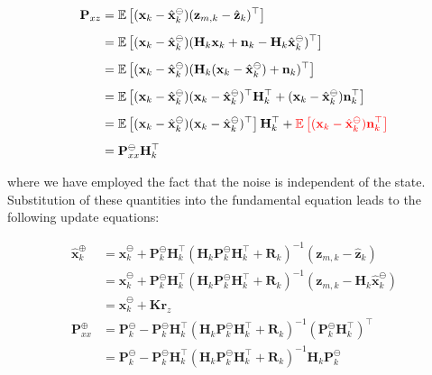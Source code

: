 \begin{align*} \mathbf{P}_{xz} &= \mathbb{E}\left[ (\mathbf{x}_k - {\hat{\mathbf{x}}_k^\ominus})(\mathbf{z}_{m,k} - \hat{\mathbf{z}}_k)^\top \right] \\[5px] &= \mathbb{E}\left[ (\mathbf{x}_k - {\hat{\mathbf{x}}_k^\ominus}) (\mathbf{H}_k\mathbf{x}_k + \mathbf{n}_k - \mathbf{H}_k{\hat{\mathbf{x}}_k^\ominus})^\top \right] \\[5px] &= \mathbb{E}\left[ (\mathbf{x}_k - {\hat{\mathbf{x}}_k^\ominus}) (\mathbf{H}_k(\mathbf{x}_k - {\hat{\mathbf{x}}_k^\ominus}) + \mathbf{n}_k)^\top \right] \\[5px] &= \mathbb{E}\left[ (\mathbf{x}_k - {\hat{\mathbf{x}}_k^\ominus})(\mathbf{x}_k - {\hat{\mathbf{x}}_k^\ominus})^\top\mathbf{H}_k^\top +(\mathbf{x}_k - {\hat{\mathbf{x}}_k^\ominus})\mathbf{n}_k^\top \right] \\[5px] &= \mathbb{E}\left[ (\mathbf{x}_k - {\hat{\mathbf{x}}_k^\ominus})(\mathbf{x}_k - {\hat{\mathbf{x}}_k^\ominus})^\top\right]\mathbf{H}_k^\top + \textcolor{red}{\mathbb{E}\left[(\mathbf{x}_k - {\hat{\mathbf{x}}_k^\ominus})\mathbf{n}_k^\top \right]} \\[5px] &= \mathbf{P}_{xx}^\ominus\mathbf{H}_k^\top \end{align*}

where we have employed the fact that the noise is independent of the state. Substitution of these quantities into the fundamental equation leads to the following update equations\+:

\begin{align*} \hat{\mathbf{x}}_k^\oplus &= {\hat{\mathbf{x}}_k^\ominus} + \mathbf{P}_{k}^\ominus\mathbf{H}_k^\top (\mathbf{H}_k\mathbf{P}_{k}^\ominus\mathbf{H}_k^\top + \mathbf{R}_{k})^{-1}(\mathbf{z}_{m,k} - \hat{\mathbf{z}}_k) \\[5px] &= {\hat{\mathbf{x}}_k^\ominus} + \mathbf{P}_{k}^\ominus\mathbf{H}_k^\top (\mathbf{H}_k\mathbf{P}_{k}^\ominus\mathbf{H}_k^\top + \mathbf{R}_{k})^{-1}(\mathbf{z}_{m,k} - \mathbf{H}_k{\hat{\mathbf{x}}_k^\ominus}) \\[5px] &= {\hat{\mathbf{x}}_k^\ominus} + \mathbf{K}\mathbf{r}_z \\[5px] \mathbf{P}_{xx}^\oplus &= \mathbf{P}_{k}^\ominus - \mathbf{P}_{k}^\ominus\mathbf{H}_k^\top (\mathbf{H}_k\mathbf{P}_{k}^\ominus\mathbf{H}_k^\top + \mathbf{R}_{k})^{-1} (\mathbf{P}_{k}^\ominus\mathbf{H}_k^\top)^\top \\[5px] &= \mathbf{P}_{k}^\ominus - \mathbf{P}_{k}^\ominus\mathbf{H}_k^\top (\mathbf{H}_k\mathbf{P}_{k}^\ominus\mathbf{H}_k^\top + \mathbf{R}_{k})^{-1} \mathbf{H}_k{\mathbf{P}_{k}^\ominus} \end{align*}

